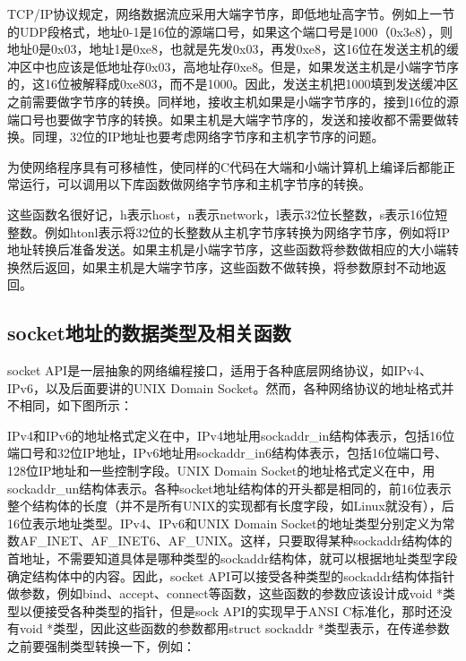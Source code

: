 TCP/\BookSplit{}IP协议规定，网络数据流应采用大端字节序，即低地址高字节。例如上一节的UDP段格式，地址0-1是16位的源端口号，如果这个端口号是1000（0x3e8），则地址0是0x03，地址1是0xe8，也就是先发0x03，再发0xe8，这16位在发送主机的缓冲区中也应该是低地址存0x03，高地址存0xe8。但是，如果发送主机是小端字节序的，这16位被解释成0xe803，而不是1000。因此，发送主机把1000填到发送缓冲区之前需要做字节序的转换。同样地，接收主机如果是小端字节序的，接到16位的源端口号也要做字节序的转换。如果主机是大端字节序的，发送和接收都不需要做转换。同理，32位的IP地址也要考虑网络字节序和主机字节序的问题。



为使网络程序具有可移植性，使同样的C代码在大端和小端计算机上编译后都能正常运行，可以调用以下库函数做网络字节序和主机字节序的转换。




这些函数名很好记，h表示host，n表示network，l表示32位长整数，s表示16位短整数。例如htonl表示将32位的长整数从主机字节序转换为网络字节序，例如将IP地址转换后准备发送。如果主机是小端字节序，这些函数将参数做相应的大小端转换然后返回，如果主机是大端字节序，这些函数不做转换，将参数原封不动地返回。


\subsection{socket地址的数据类型及相关函数}
%


socket API是一层抽象的网络编程接口，适用于各种底层网络协议，如IPv4、IPv6，以及后面要讲的UNIX Domain Socket。然而，各种网络协议的地址格式并不相同，如下图所示：




IPv4和IPv6的地址格式定义在中，IPv4地址用sockaddr\_\BookSplit{}in结构体表示，包括16位端口号和32位IP地址，IPv6地址用sockaddr\_\BookSplit{}in6结构体表示，包括16位端口号、128位IP地址和一些控制字段。UNIX Domain Socket的地址格式定义在中，用sockaddr\_\BookSplit{}un结构体表示。各种socket地址结构体的开头都是相同的，前16位表示整个结构体的长度（并不是所有UNIX的实现都有长度字段，如Linux就没有），后16位表示地址类型。IPv4、IPv6和UNIX Domain Socket的地址类型分别定义为常数AF\_\BookSplit{}INET、AF\_\BookSplit{}INET6、AF\_\BookSplit{}UNIX。这样，只要取得某种sockaddr结构体的首地址，不需要知道具体是哪种类型的sockaddr结构体，就可以根据地址类型字段确定结构体中的内容。因此，socket API可以接受各种类型的sockaddr结构体指针做参数，例如bind、accept、connect等函数，这些函数的参数应该设计成void *类型以便接受各种类型的指针，但是sock API的实现早于ANSI C标准化，那时还没有void *类型，因此这些函数的参数都用struct sockaddr *类型表示，在传递参数之前要强制类型转换一下，例如：


